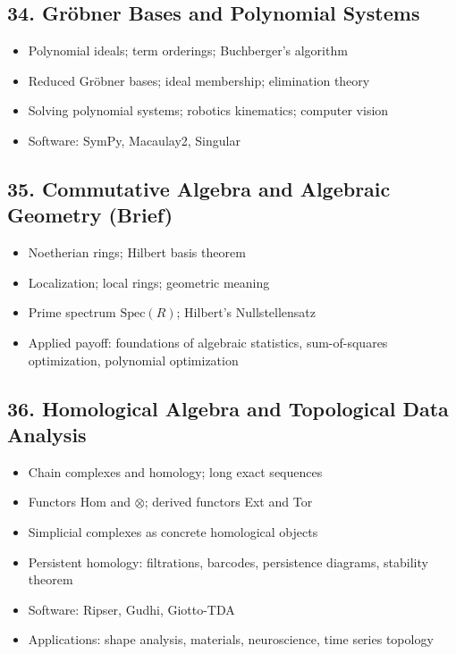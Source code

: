 \subsection{34. Gr\"obner Bases and Polynomial Systems}
\begin{itemize}
\item Polynomial ideals; term orderings; Buchberger's algorithm
\item Reduced Gr\"obner bases; ideal membership; elimination theory
\item Solving polynomial systems; robotics kinematics; computer vision
\item Software: SymPy, Macaulay2, Singular
\end{itemize}

\subsection{35. Commutative Algebra and Algebraic Geometry (Brief)}
\begin{itemize}
\item Noetherian rings; Hilbert basis theorem
\item Localization; local rings; geometric meaning
\item Prime spectrum $\mathrm{Spec}(R)$; Hilbert's Nullstellensatz
\item Applied payoff: foundations of algebraic statistics, sum-of-squares optimization, polynomial optimization
\end{itemize}

\subsection{36. Homological Algebra and Topological Data Analysis}
\begin{itemize}
\item Chain complexes and homology; long exact sequences
\item Functors Hom and $\otimes$; derived functors Ext and Tor
\item Simplicial complexes as concrete homological objects
\item Persistent homology: filtrations, barcodes, persistence diagrams, stability theorem
\item Software: Ripser, Gudhi, Giotto-TDA
\item Applications: shape analysis, materials, neuroscience, time series topology
\end{itemize}
